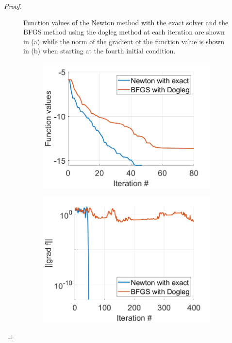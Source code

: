 \documentclass[12pt]{report}
\begin{document}
\begin{problem}
\begin{proof}
\begin{figure}[H]
\begin{subfigure}[b]{0.5\linewidth}
        \caption{}
        \label{fig7:b}
        \vspace{4ex}
    \end{subfigure}
    \caption{Function values of the Newton method with the exact solver and the BFGS method using the dogleg method at each iteration are shown in (a) while the norm of the gradient of the function value is shown in (b) when starting at the fourth initial condition.}
    \label{fig7}
\end{figure}
\begin{figure}[H]
    \begin{subfigure}[b]{0.5\linewidth}
        \centering
        \includegraphics[width=\linewidth]{images/3-5-fun.png}
        \caption{}
        \label{fig8:a}
        \vspace{4ex}
    \end{subfigure}%
    \begin{subfigure}[b]{0.5\linewidth}
        \centering
        \includegraphics[width=\linewidth]{images/3-5-grad.png}

\end{subfigure}
\end{figure}
\end{proof}
\end{problem}
\end{document}
